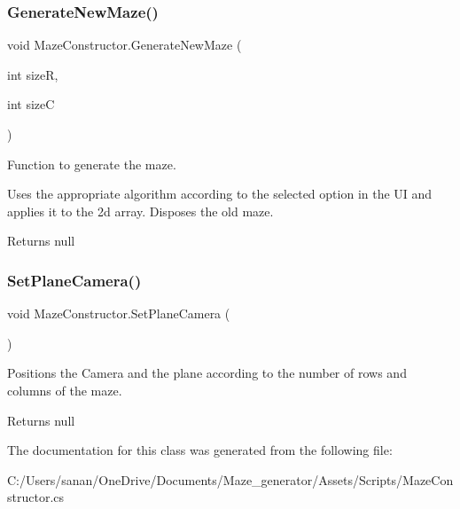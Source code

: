 \subsubsection{\texorpdfstring{GenerateNewMaze()}{GenerateNewMaze()}}
{\footnotesize\ttfamily void Maze\+Constructor.\+Generate\+New\+Maze (\begin{DoxyParamCaption}\item[{int}]{sizeR,  }\item[{int}]{sizeC }\end{DoxyParamCaption})}



Function to generate the maze. 

Uses the appropriate algorithm according to the selected option in the UI and applies it to the 2d array. Disposes the old maze.

\begin{DoxyReturn}{Returns}
null 
\end{DoxyReturn}
\mbox{\label{class_maze_constructor_a209b5c76afef240cbcfbd50032d6e35a}} 
\subsubsection{\texorpdfstring{SetPlaneCamera()}{SetPlaneCamera()}}
{\footnotesize\ttfamily void Maze\+Constructor.\+Set\+Plane\+Camera (\begin{DoxyParamCaption}{ }\end{DoxyParamCaption})\hspace{0.3cm}{\ttfamily [private]}}



Positions the Camera and the plane according to the number of rows and columns of the maze. 

\begin{DoxyReturn}{Returns}
null 
\end{DoxyReturn}


The documentation for this class was generated from the following file\+:\begin{DoxyCompactItemize}
\item 
C\+:/\+Users/sanan/\+One\+Drive/\+Documents/\+Maze\+\_\+generator/\+Assets/\+Scripts/Maze\+Constructor.\+cs\end{DoxyCompactItemize}
